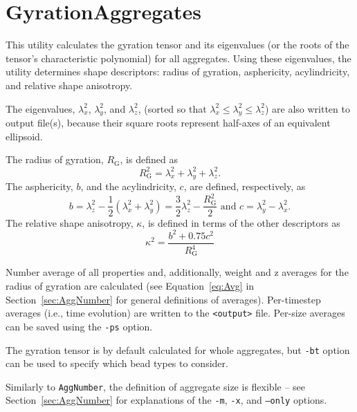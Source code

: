 \section{GyrationAggregates} \label{sec:GyrationAggregates}

This utility calculates the gyration tensor and its eigenvalues (or the
roots of the tensor's characteristic polynomial) for all aggregates. Using
these eigenvalues, the utility determines shape descriptors:
radius of gyration, asphericity, acylindricity, and relative shape
anisotropy.

The eigenvalues, $\lambda_x^2$, $\lambda_y^2$, and $\lambda_z^2$, (sorted
so that $\lambda_x^2\leq\lambda_y^2\leq\lambda_z^2$) are also written to
output file(s), because their square roots represent half-axes of an
equivalent ellipsoid.

The radius of gyration, $R_{\mathrm{G}}$, is defined as
\begin{equation} \label{eq:R_G}
  R_{\mathrm{G}}^2 = \lambda_x^2 + \lambda_y^2 + \lambda_z^2.
\end{equation}
The asphericity, $b$, and the acylindricity, $c$, are defined,
respectively, as
\begin{equation} \label{eq:b}
  b= \lambda_z^2 - \frac{1}{2}(\lambda_x^2 + \lambda_y^2) =
    \frac{3}{2}\lambda_z^2 - \frac{R_{\mathrm{G}}^2}{2}
  \mbox{ \ \ and \ \ }
  c = \lambda_y^2 - \lambda_x^2.
\end{equation}
The relative shape anisotropy, $\kappa$, is defined in terms of the other
descriptors as
\begin{equation} \label{eq:anis}
  \kappa^2 = \frac{b^2 + 0.75 c^2}{R_{\mathrm{G}}^4}
\end{equation}

Number average of all properties and, additionally, weight and z averages
for the radius of gyration are calculated (see Equation~\eqref{eq:Avg} in
Section~\ref{sec:AggNumber} for general definitions of averages).
Per-timestep averages (i.e., time evolution) are written to the
\texttt{<output>} file. Per-size averages can be saved using the
\texttt{-ps} option.

The gyration tensor is by default calculated for whole aggregates, but
\texttt{-bt} option can be used to specify which bead types to consider.

Similarly to \texttt{AggNumber}, the definition of aggregate size is
flexible -- see Section~\ref{sec:AggNumber} for explanations of the
\texttt{-m}, \texttt{-x}, and \texttt{--only} options.

